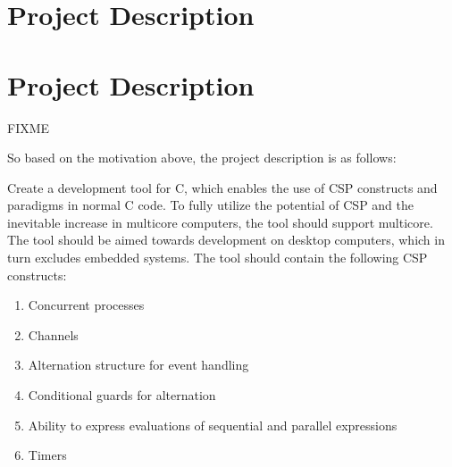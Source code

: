 \setcounter{page}{0}
\newpage
{}
\section*{Project Description}

\section{Project Description}
\label{sec:project_description}

FIXME

So based on the motivation above, the project description is as follows:

Create a development tool for C, which enables the use of CSP constructs and paradigms in normal C code. To fully utilize the potential of CSP and the inevitable increase in multicore computers, the tool should support multicore. The tool should be aimed towards development on desktop computers, which in turn excludes embedded systems. The tool should contain the following CSP constructs:

\begin{enumerate}
    \item Concurrent processes
    \item Channels
    \item Alternation structure for event handling
    \item Conditional guards for alternation
    \item Ability to express evaluations of sequential and parallel expressions
    \item Timers
\end{enumerate}

\afterpage{\blankpage}
